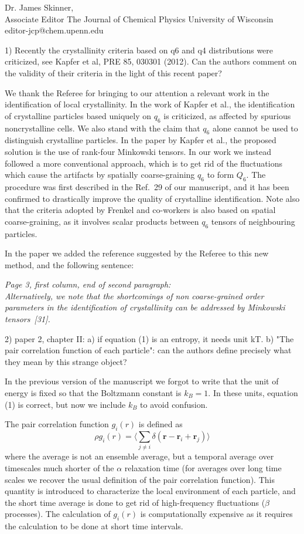 \documentclass[a4paper, rebuttal, parskip=true, firsthead=false, fromemail=false, foldmarks=false]{scrlttr2}
\begin{document}
\begin{letter}{Dr. James Skinner,\\Associate Editor
The Journal of Chemical Physics
University of Wisconsin\\
editor-jcp@chem.upenn.edu }
\begin{quotationi}
1) Recently the crystallinity criteria based on q6 and q4 distributions
were criticized, see Kapfer et al, PRE 85, 030301 (2012). Can the authors
comment on the validity of their criteria in the light of this recent paper?
\end{quotationi}

We thank the Referee for bringing to our attention a relevant work in the identification of
local crystallinity. In the work of Kapfer et al., the identification of crystalline
particles based uniquely on $q_6$ is criticized, as affected by spurious noncrystalline cells.
We also stand with the claim that $q_6$ alone cannot be used to distinguish crystalline particles. In the
paper by Kapfer et al., the proposed solution is the use of rank-four Minkowski tensors. In our work
we instead followed a more conventional approach, which is to get rid of the fluctuations which
cause the artifacts by spatially coarse-graining $q_6$ to form $Q_6$. The procedure was first
described in the Ref.~29 of our manuscript, and it has been confirmed to drastically improve the
quality of crystalline identification. Note also that the criteria adopted by Frenkel and co-workers
is also based on spatial coarse-graining, as it involves scalar products between $q_6$ tensors of
neighbouring particles.

In the paper we added the reference suggested by the Referee to this new method, and the following sentence:

{\it Page 3, first column, end of second paragraph:\\
Alternatively, we note that the shortcomings of
non coarse-grained order parameters in the identification of crystallinity can be addressed by Minkowski tensors~[31]. 
}


\begin{quotationi}
2) paper 2, chapter II: a) if equation (1) is an entropy, it needs unit kT.
b) "The pair correlation function of each particle": can the authors
define precisely what they mean by this strange object?
\end{quotationi}

In the previous version of the manuscript we forgot to write that the unit of energy is
fixed so that the Boltzmann constant is $k_B=1$. In these units, equation (1) is correct, but now we include
$k_B$ to avoid confusion.

The pair correlation function $g_i(r)$ is defined as
$$
\rho g_i(r)=\langle \sum_{j\neq i}\delta(\mathbf{r}-\mathbf{r}_i+\mathbf{r}_j)\rangle
$$
where the average is not an ensemble average, but a temporal average over timescales much shorter
of the $\alpha$ relaxation time (for averages over long time scales we recover the usual definition
of the pair correlation function). This quantity is introduced to characterize the local environment
of each particle, and the short time average is done to get rid of high-frequency fluctuations ($\beta$ processes).
The calculation of $ g_i(r)$ is computationally expensive as it requires the calculation to be done at short
time intervals.


\end{letter}
\end{document}

